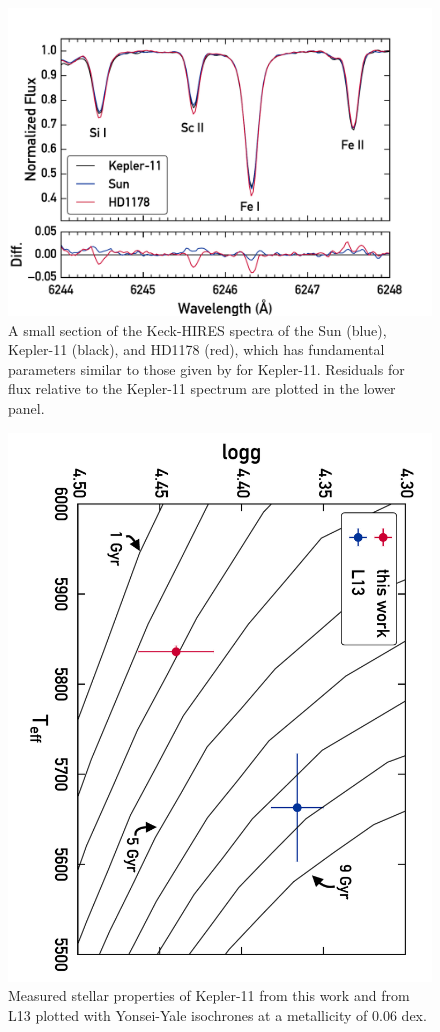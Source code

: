 \documentclass[twocolumn,trackchanges]{aastex61}
\begin{document}
\begin{figure}
\centering
\includegraphics[width=\columnwidth]{spec}
\caption{A small section of the Keck-HIRES spectra of the Sun (blue), Kepler-11 (black), and HD1178 (red), which has fundamental parameters similar to those given by \citet{Lissauer2013} for Kepler-11. Residuals for flux relative to the Kepler-11 spectrum are plotted in the lower panel.}
\label{fig:spec}
\end{figure}


\begin{figure}
\centering
\includegraphics[angle=270,width=\columnwidth]{isochrones_annotated}
\caption{Measured stellar properties of Kepler-11 from this work and from L13 plotted with Yonsei-Yale isochrones at a metallicity of 0.06 dex.}
\label{fig:isochrones}
\end{figure}
\end{document}
